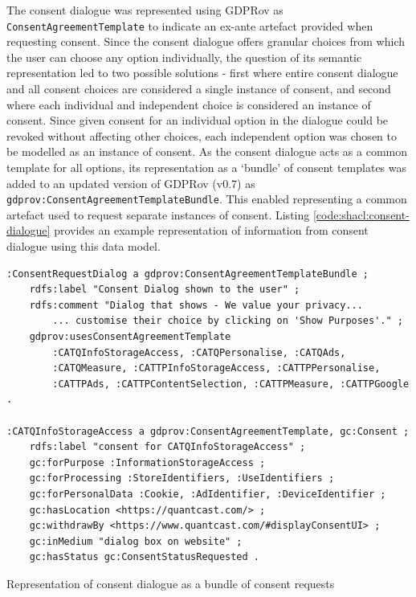 The consent dialogue was represented using GDPRov as \texttt{ConsentAgreementTemplate} to indicate an ex-ante artefact provided when requesting consent.
Since the consent dialogue offers granular choices from which the user can choose any option individually, the question of its semantic representation led to two possible solutions - first where entire consent dialogue and all consent choices are considered a single instance of consent, and second where each individual and independent choice is considered an instance of consent.
Since given consent for an individual option in the dialogue could be revoked without affecting other choices, each independent option was chosen to be modelled as an instance of consent.
As the consent dialogue acts as a common template for all options, its representation as a `bundle' of consent templates was added to an updated version of GDPRov (v0.7) as \texttt{gdprov:ConsentAgreementTemplateBundle}. This enabled representing a common artefact used to request separate instances of consent.
Listing \autoref{code:shacl:consent-dialogue} provides an example representation of information from consent dialogue using this data model.
\begin{listing}[htbp]
\begin{verbatim}
:ConsentRequestDialog a gdprov:ConsentAgreementTemplateBundle ;
    rdfs:label "Consent Dialog shown to the user" ;
    rdfs:comment "Dialog that shows - We value your privacy...
        ... customise their choice by clicking on 'Show Purposes'." ;
    gdprov:usesConsentAgreementTemplate 
        :CATQInfoStorageAccess, :CATQPersonalise, :CATQAds, 
        :CATQMeasure, :CATTPInfoStorageAccess, :CATTPPersonalise, 
        :CATTPAds, :CATTPContentSelection, :CATTPMeasure, :CATTPGoogle .

:CATQInfoStorageAccess a gdprov:ConsentAgreementTemplate, gc:Consent ;
    rdfs:label "consent for CATQInfoStorageAccess" ;
    gc:forPurpose :InformationStorageAccess ;
    gc:forProcessing :StoreIdentifiers, :UseIdentifiers ;
    gc:forPersonalData :Cookie, :AdIdentifier, :DeviceIdentifier ;
    gc:hasLocation <https://quantcast.com/> ;
    gc:withdrawBy <https://www.quantcast.com/#displayConsentUI> ;
    gc:inMedium "dialog box on website" ;
    gc:hasStatus gc:ConsentStatusRequested .
\end{verbatim}
\caption{Representation of consent dialogue as a bundle of consent requests}
\label{code:shacl:consent-dialogue}
\end{listing}

